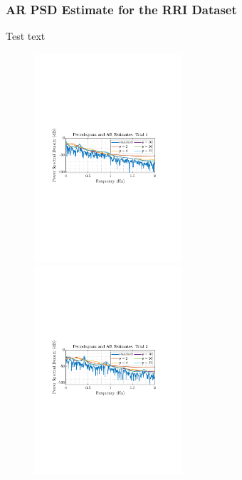 \documentclass[12pt]{article}
\begin{document}
	\subsubsection{AR PSD Estimate for the RRI Dataset}
	Test text \\
	\begin{figure}
		\vspace{-20pt}
		\begin{centering}
			\includegraphics[trim={2.2cm 11.2cm 3.15cm  11.2cm}, clip, width=0.49\textwidth]{../MATLAB/figures/q1_5c_fig01.pdf} 
		\end{centering}
		\begin{centering}
			\includegraphics[trim={2.2cm 11.2cm 3.15cm  11.2cm}, clip, width=0.49\textwidth]{../MATLAB/figures/q1_5c_fig02.pdf} 

\end{centering}
\end{figure}
\end{document}
